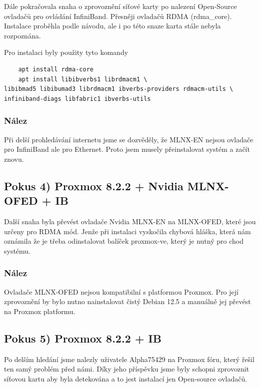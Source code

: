 Dále pokračovala snaha o zprovoznění síťové karty po nalezení Open-Source ovladačů pro ovládání InfiniBand\cite{InfiniBand}. Přesněji ovladačů RDMA\cite{guideDeb} (rdma\_core). Instalace proběhla podle návodu\cite{guideDeb}, ale i po této snaze karta stále nebyla rozpoznána.

Pro instalaci byly použity tyto komandy
\begin{verbatim}
    apt install rdma-core
    apt install libibverbs1 librdmacm1 \
libibmad5 libibumad3 librdmacm1 ibverbs-providers rdmacm-utils \
infiniband-diags libfabric1 ibverbs-utils
\end{verbatim}

\subsubsection{Nález}
Při delší prohledávání internetu jsme se dozvěděly, že MLNX-EN\cite{EN} nejsou ovladače pro InfiniBand ale pro Ethernet. Proto jsem musely přeinstalovat systém a začít znovu.

\subsection{Pokus 4) Proxmox 8.2.2 + Nvidia MLNX-OFED + IB}
\label{pokus4}
\nepovedeno

Další snaha byla převést ovladače Nvidia MLNX-EN\cite{EN} na MLNX-OFED\cite{OFED}, které jsou určeny pro RDMA\cite{RDMA} mód. Jenže při instalaci vyskočila chybová hláška, která nám oznámila že je třeba odinstalovat balíček proxmox-ve, který je nutný pro chod systému.

\subsubsection{Nález}
Ovladače MLNX-OFED\cite{OFED} nejsou kompatibilní s platformou Proxmox. Pro její zprovoznění by bylo nutno nainstalovat čistý Debian 12.5 a manuálně jej převést na Proxmox platformu.

\subsection{Pokus 5) Proxmox 8.2.2 + IB}
\label{pokus5}
\nepovedeno

Po delším hledání jsme nalezly uživatele Alpha75429 na  Proxmox fóru, který řešil ten samý problém před námi. Díky jeho příspěvku\cite{guide} jsme byly schopni zprovoznit síťovou kartu aby byla detekována a to jest instalací jen Open-source ovladačů.

